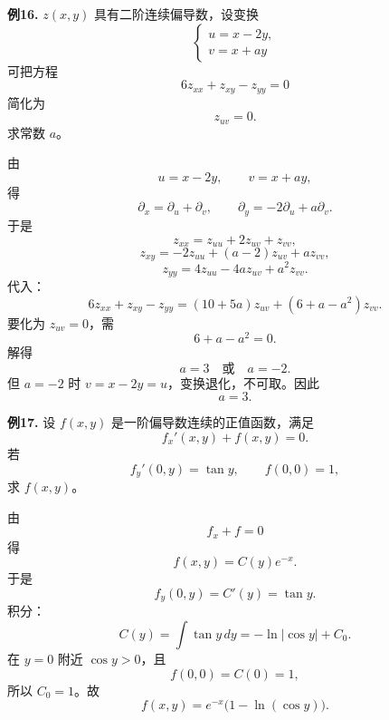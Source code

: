 \begin{problemblock}
\textbf{例16.} \(z(x,y)\) 具有二阶连续偏导数，设变换
\[
\begin{cases}
u=x-2y,\\
v=x+ay
\end{cases}
\]
可把方程
\[
6z_{xx}+z_{xy}-z_{yy}=0
\]
简化为
\[
z_{uv}=0.
\]
求常数 \(a\)。
\end{problemblock}
\begin{solutionblock}
由
\[
u=x-2y,\qquad v=x+ay,
\]
得
\[
\partial_x=\partial_u+\partial_v,\qquad
\partial_y=-2\partial_u+a\partial_v.
\]
于是
\[
z_{xx}=z_{uu}+2z_{uv}+z_{vv},
\]
\[
z_{xy}=-2z_{uu}+(a-2)z_{uv}+az_{vv},
\]
\[
z_{yy}=4z_{uu}-4az_{uv}+a^2z_{vv}.
\]
代入：
\[
6z_{xx}+z_{xy}-z_{yy}
=(10+5a)z_{uv}+(6+a-a^2)z_{vv}.
\]
要化为 \(z_{uv}=0\)，需
\[
6+a-a^2=0.
\]
解得
\[
a=3\quad\text{或}\quad a=-2.
\]
但 \(a=-2\) 时 \(v=x-2y=u\)，变换退化，不可取。因此
\[
a=3.
\]
\end{solutionblock}

\begin{problemblock}
\textbf{例17.} 设 \(f(x,y)\) 是一阶偏导数连续的正值函数，满足
\[
f_x'(x,y)+f(x,y)=0.
\]
若
\[
f_y'(0,y)=\tan y,\qquad f(0,0)=1,
\]
求 \(f(x,y)\)。
\end{problemblock}
\begin{solutionblock}
由
\[
f_x+f=0
\]
得
\[
f(x,y)=C(y)e^{-x}.
\]
于是
\[
f_y(0,y)=C'(y)=\tan y.
\]
积分：
\[
C(y)=\int \tan y\,dy=-\ln|\cos y|+C_0.
\]
在 \(y=0\) 附近 \(\cos y>0\)，且
\[
f(0,0)=C(0)=1,
\]
所以 \(C_0=1\)。故
\[
f(x,y)=e^{-x}\bigl(1-\ln(\cos y)\bigr).
\]
\end{solutionblock}

